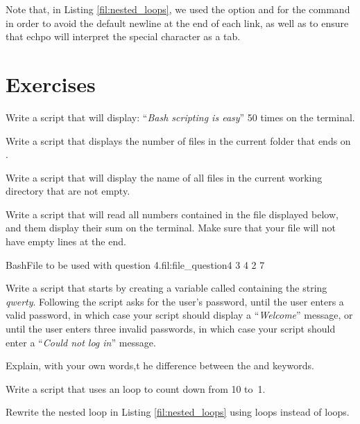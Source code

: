 Note that, in Listing \ref{fil:nested_loops}, we used the option  and  for the  command in order to avoid the default newline at the end of each link, as well as to ensure that echpo will interpret the special character  as a tab.


\section*{Exercises}

\begin{exercises}
  \item Write a script that will display: ``\textit{Bash scripting is easy}'' 50 times on the terminal.
  \item Write a script that displays the number of files in the current folder that ends on .
  \item Write a script that will display the name of all  files in the current working directory that are not empty.
  \item Write a script that will read all numbers contained in the file displayed below, and them display their sum on the terminal. Make sure that your file will not have empty lines at the end.
  \begin{source_code_float}{Bash}{File to be used with question 4.}{fil:file_question4}
3
4
2
7
\end{source_code_float}
  \item Write a script that starts by creating a variable called  containing the string \textit{qwerty}. Following the script asks for the user's password, until the user enters a valid password, in which case your script should display a ``\textit{Welcome}'' message, or until the user enters three invalid passwords, in which case your script should enter a ``\textit{Could not log in}'' message.
   \item Explain, with your own words,t he difference between the  and  keywords.
  \item Write a script that uses an  loop to count down from 10 to~1.
  \item Rewrite the nested loop in Listing \ref{fil:nested_loops} using  loops instead of  loops.
\end{exercises}